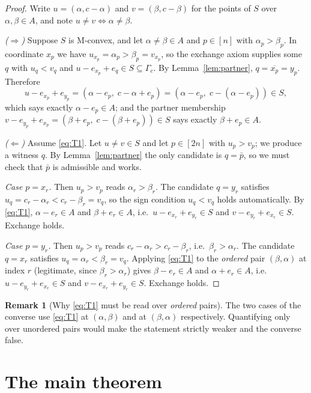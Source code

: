 \documentclass[11pt]{article}
\theoremstyle{definition}
\newtheorem{remark}[theorem]{Remark}
\begin{document}
\begin{proof}
Write $u=(\alpha,c-\alpha)$ and $v=(\beta,c-\beta)$ for the points of $S$ over
$\alpha,\beta\in A$, and note $u\ne v\iff\alpha\ne\beta$.

\emph{($\Rightarrow$)} Suppose $S$ is M-convex, and let $\alpha\ne\beta\in A$ and $p\in[n]$
with $\alpha_p>\beta_p$. In coordinate $x_p$ we have $u_{x_p}=\alpha_p>\beta_p=v_{x_p}$, so
the exchange axiom supplies some $q$ with $u_q<v_q$ and $u-e_{x_p}+e_q\in S\subseteq\Gamma_c$.
By Lemma~\ref{lem:partner}, $q=\overline{x_p}=y_p$. Therefore
\[
u-e_{x_p}+e_{y_p}=(\alpha-e_p,\;c-\alpha+e_p)=(\alpha-e_p,\;c-(\alpha-e_p))\in S,
\]
which says exactly $\alpha-e_p\in A$; and the partner membership
$v-e_{y_p}+e_{x_p}=(\beta+e_p,\;c-(\beta+e_p))\in S$ says exactly $\beta+e_p\in A$.

\emph{($\Leftarrow$)} Assume \eqref{eq:T1}. Let $u\ne v\in S$ and let $p\in[2n]$ with
$u_p>v_p$; we produce a witness $q$. By Lemma~\ref{lem:partner} the only candidate is
$q=\bar p$, so we must check that $\bar p$ is admissible and works.

\emph{Case $p=x_r$.} Then $u_p>v_p$ reads $\alpha_r>\beta_r$. The candidate $q=y_r$ satisfies
$u_q=c_r-\alpha_r<c_r-\beta_r=v_q$, so the sign condition $u_q<v_q$ holds automatically.
By \eqref{eq:T1}, $\alpha-e_r\in A$ and $\beta+e_r\in A$, i.e.\ $u-e_{x_r}+e_{y_r}\in S$ and
$v-e_{y_r}+e_{x_r}\in S$. Exchange holds.

\emph{Case $p=y_r$.} Then $u_p>v_p$ reads $c_r-\alpha_r>c_r-\beta_r$, i.e.\
$\beta_r>\alpha_r$. The candidate $q=x_r$ satisfies $u_q=\alpha_r<\beta_r=v_q$. Applying
\eqref{eq:T1} to the \emph{ordered} pair $(\beta,\alpha)$ at index $r$ (legitimate, since
$\beta_r>\alpha_r$) gives $\beta-e_r\in A$ and $\alpha+e_r\in A$, i.e.\
$u-e_{y_r}+e_{x_r}\in S$ and $v-e_{x_r}+e_{y_r}\in S$. Exchange holds. \qedhere
\end{proof}

\begin{remark}[Why \eqref{eq:T1} must be read over \emph{ordered} pairs]
The two cases of the converse use \eqref{eq:T1} at $(\alpha,\beta)$ and at $(\beta,\alpha)$
respectively. Quantifying only over unordered pairs would make the statement strictly
weaker and the converse false.
\end{remark}

\section{The main theorem}
\end{document}
